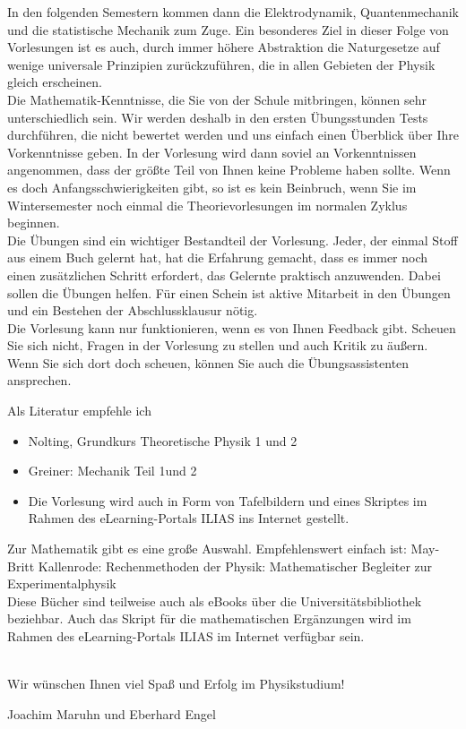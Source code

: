 In den folgenden Semestern kommen dann die Elektrodynamik, Quantenmechanik und die statistische Mechanik zum Zuge. Ein besonderes Ziel in dieser Folge von Vorlesungen ist es auch, durch immer höhere Abstraktion die Naturgesetze auf wenige universale Prinzipien zurückzuführen, die in allen Gebieten der Physik gleich erscheinen.
\\
Die Mathematik-Kenntnisse, die Sie von der Schule mitbringen, können sehr unterschiedlich sein. Wir werden deshalb in den ersten Übungsstunden Tests durchführen, die nicht bewertet werden und uns einfach einen Überblick über Ihre Vorkenntnisse geben. In der Vorlesung wird dann soviel an Vorkenntnissen angenommen, dass der größte Teil von Ihnen keine Probleme haben sollte. Wenn es doch Anfangsschwierigkeiten gibt, so ist es kein Beinbruch, wenn Sie im Wintersemester noch einmal die Theorievorlesungen im normalen Zyklus beginnen.
\\
Die Übungen sind ein wichtiger Bestandteil der Vorlesung. Jeder, der einmal Stoff aus einem Buch gelernt hat, hat die Erfahrung gemacht, dass es immer noch einen zusätzlichen Schritt erfordert, das Gelernte praktisch anzuwenden. Dabei sollen die Übungen helfen. Für einen Schein ist aktive Mitarbeit in den Übungen und ein Bestehen der Abschlussklausur nötig.
\\
Die Vorlesung kann nur funktionieren, wenn es von Ihnen Feedback gibt. Scheuen Sie sich nicht, Fragen in der Vorlesung zu stellen und auch Kritik zu äußern. Wenn Sie sich dort doch scheuen, können Sie auch die Übungsassistenten ansprechen.

\medskip

Als Literatur empfehle ich
\begin{itemize}
  \item Nolting, Grundkurs Theoretische Physik 1 und 2
  \item Greiner: Mechanik Teil 1und 2
  \item Die Vorlesung wird auch in Form von Tafelbildern und eines Skriptes im Rahmen des eLearning-Portals ILIAS ins Internet gestellt.
\end{itemize}

\noindent
Zur Mathematik gibt es eine große Auswahl.
Empfehlenswert einfach ist:
May-Britt Kallenrode: Rechenmethoden der Physik: Mathematischer Begleiter zur Experimentalphysik\\
Diese Bücher sind teilweise auch als eBooks über die Universitätsbibliothek beziehbar.
Auch das Skript für die mathematischen Ergänzungen wird im Rahmen des eLearning-Portals ILIAS im Internet verfügbar sein.\\
\\
\noindent

Wir wünschen Ihnen viel Spaß und Erfolg im Physikstudium!\\
\begin{flushright}
Joachim Maruhn und Eberhard Engel
\end{flushright}

